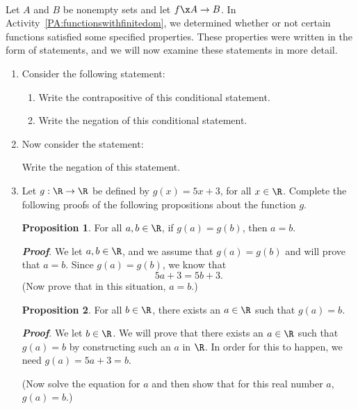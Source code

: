 \begin{previewactivity}
\label{PA:functionstatements} \hfill \\
Let $A$ and $B$ be nonempty sets and let $f\x A \to B$.  
In \typeu Activity~\ref*{PA:functionswithfinitedom}, we determined whether or not certain functions satisfied some specified properties.  These properties were written in the form of statements, and we will now examine these statements in more detail.
\begin{enumerate}
\item Consider the following statement:

\begin{enumerate} \label{PA:functionstatements1}
\item Write the contrapositive of this conditional statement.

\item Write the negation of this conditional statement.
\end{enumerate}

\item Now consider the statement:
\label{PA:functionstatements2}%
Write the negation of this statement.

\item Let $g:\R \to \R$ be defined by $g ( x ) = 5x + 3$, for all $x \in \R$.  Complete the following proofs of the following propositions about the function $g$.
\label{PA:functionstatements3}

\newpar
\textbf{Proposition 1}.  For all $a, b \in \R$, if $g ( a ) = g ( b )$, then $a = b$.

\noindent
\textbf{\emph{Proof}}.  We let $a, b \in \R$, and we assume that 
$g ( a ) = g ( b )$ and will prove that $a = b$.  Since $g(a) = g(b)$, we know that
\[
5a + 3 = 5b + 3.
\]
(Now prove that in this situation, $a = b$.)

\newpar
\textbf{Proposition 2}.  For all $b \in \R$, there exists an $a \in \R$ such that $g ( a ) = b$.

\noindent
\textbf{\emph{Proof}}.  We let $b \in \R$.  We will prove that there exists an $a \in \R$ such that 
$g ( a ) = b$ by constructing such an $a$ in $\R$.  In order for this to happen, we need $g(a) = 5a + 3 = b$.

\noindent
(Now solve the equation for $a$ and then show that for this real number $a$, 
$g ( a ) = b$.)
\end{enumerate}

\end{previewactivity}
\hbreak

\endinput
